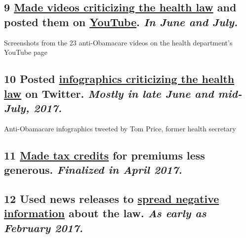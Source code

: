 \hypertarget{9-made-videos-criticizing-the-health-law-and-posted-them-on-youtube-in-june-and-july}{%
\subsection{\texorpdfstring{\textbf{9}
\href{https://www.nytimes3xbfgragh.onion/interactive/2017/09/04/us/hhs-anti-obamacare-campaign.html?mcubz=0}{Made
videos criticizing the health law} and posted them on
\href{https://www.youtube.com/user/USGOVHHS}{YouTube}. \emph{In June and
July.}}{9 Made videos criticizing the health law and posted them on YouTube. In June and July.}}\label{9-made-videos-criticizing-the-health-law-and-posted-them-on-youtube-in-june-and-july}}

Screenshots from the 23 anti-Obamacare videos on the health department's
YouTube page

\hypertarget{10-posted-infographics-criticizing-the-health-law-on-twitter-mostly-in-late-june-and-mid-july-2017}{%
\subsection{\texorpdfstring{\textbf{10} Posted
\href{https://www.nytimes3xbfgragh.onion/interactive/2017/09/04/us/hhs-anti-obamacare-campaign.html?mcubz=0}{infographics
criticizing the health law} on Twitter. \emph{Mostly in late June and
mid-July,
2017.}}{10 Posted infographics criticizing the health law on Twitter. Mostly in late June and mid-July, 2017.}}\label{10-posted-infographics-criticizing-the-health-law-on-twitter-mostly-in-late-june-and-mid-july-2017}}

Anti-Obamacare infographics tweeted by Tom Price, former health
secretary

\hypertarget{11-made-tax-credits-for-premiums-less-generous-finalized-in-april-2017}{%
\subsection{\texorpdfstring{\textbf{11}
\href{https://www.nytimes3xbfgragh.onion/interactive/2017/07/19/us/what-trump-can-do-to-let-obamacare-fail.html?mcubz=0}{Made
tax credits} for premiums less generous. \emph{Finalized in April
2017.}}{11 Made tax credits for premiums less generous. Finalized in April 2017.}}\label{11-made-tax-credits-for-premiums-less-generous-finalized-in-april-2017}}

\hypertarget{12-used-news-releases-to-spread-negative-information-about-the-law-as-early-as-february-2017}{%
\subsection{\texorpdfstring{\textbf{12} Used news releases to
\href{https://www.hhs.gov/about/news/2017/02/28/statement-secretary-price-president-trumps-address-congress.html}{spread
negative information} about the law. \emph{As early as February
2017.}}{12 Used news releases to spread negative information about the law. As early as February 2017.}}\label{12-used-news-releases-to-spread-negative-information-about-the-law-as-early-as-february-2017}}

